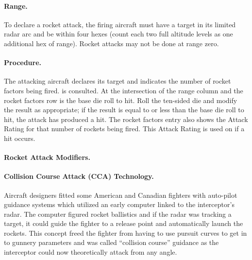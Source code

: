 \begin{advancedrules}
{\paragraph{Range.} To declare a rocket attack, the firing aircraft must have a target in its limited radar arc and be within four hexes (count each two full altitude levels as one additional hex of range). Rocket attacks may not be done at range zero.

\paragraph{Procedure.} The attacking aircraft declares its target and indicates the number of rocket factors being fired.  is consulted. At the intersection of the range column and the rocket factors row is the base die roll to hit. Roll the ten-sided die and modify the result as appropriate; if the result is equal to or less than the base die roll to hit, the attack has produced a hit. The rocket factors entry also shows the Attack Rating for that number of rockets being fired. This Attack Rating is used on  if a hit occurs.

\paragraph{Rocket Attack Modifiers.} 

\paragraph{Collision Course Attack (CCA) Technology.} Aircraft designers fitted some American and Canadian fighters with auto-pilot guidance systems which utilized an early computer linked to the interceptor's radar. The computer figured rocket ballistics and if the radar was tracking a target, it could guide the fighter to a release point and automatically launch the rockets. This concept freed the fighter from having to use pursuit curves to get in to gunnery parameters and was called “collision course” guidance as the interceptor could now theoretically attack from any angle.

}
\end{advancedrules}
